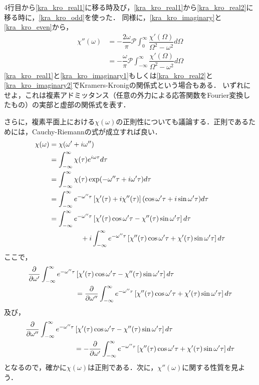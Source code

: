 4行目から\eqref{kra_kro_real1}に移る時及び，\eqref{kra_kro_real1}から\eqref{kra_kro_real2}に移る時に，\eqref{kra_kro_odd}を使った．
同様に，\eqref{kra_kro_imaginary}と\eqref{kra_kro_even}から，
\begin{align}
  \chi''(\omega) &=  - \dfrac{2\omega}{\pi}\mathcal{P}\int^\infty_0\dfrac{\chi'(\Omega)}{\Omega^2 - \omega^2}d\Omega\label{kra_kro_imaginary1} \\
  &=  - \dfrac{\omega}{\pi}\mathcal{P}\int^\infty_{ - \infty}\dfrac{\chi'(\Omega)}{\Omega^2 - \omega^2}d\Omega\label{kra_kro_imaginary2}
\end{align}
\eqref{kra_kro_real1}と\eqref{kra_kro_imaginary1}もしくは\eqref{kra_kro_real2}と\eqref{kra_kro_imaginary2}でKramers-Kronigの関係式という場合もある．
いずれにせよ，これは複素アドミッタンス（任意の外力による応答関数をFourier変換したもの）の実部と虚部の関係式を表す．

さらに，複素平面上における$\chi(\omega)$の正則性についても議論する．正則であるためには，Cauchy-Riemannの式が成立すれば良い．
\begin{align}
  \chi(\omega) &= \chi(\omega'+i\omega'')\notag \\
  &= \int^\infty_{ - \infty} \chi(\tau)e^{i\omega\tau}d\tau\notag \\
  &= \int^\infty_{ - \infty} \chi(\tau)\exp( - \omega''\tau+i\omega'\tau)d\tau\notag \\
  &= \int^\infty_{ - \infty} e^{ - \omega''\tau}\left[\chi'(\tau)+i\chi''(\tau)\right](\cos\omega'\tau+i\sin\omega'\tau)d\tau\notag \\
  &= \int^\infty_{ - \infty} e^{ - \omega''\tau}\left[\chi'(\tau)\cos\omega'\tau - \chi''(\tau)\sin\omega'\tau\right]d\tau\notag \\
  & \hspace{45pt} +i\int^\infty_{ - \infty} e^{ - \omega''\tau}\left[\chi''(\tau)\cos\omega'\tau+\chi'(\tau)\sin\omega'\tau\right]d\tau\label{kra_kro_chi_comp}
\end{align}
ここで，
\begin{align}
  \dfrac{\partial}{\partial{\omega'}}\int^\infty_{ - \infty} e^{ - \omega''\tau}&\left[\chi'(\tau)\cos\omega'\tau - \chi''(\tau)\sin\omega'\tau\right]d\tau\notag \\
  &= \dfrac{\partial}{\partial{\omega''}}\int^\infty_{ - \infty} e^{ - \omega''\tau}\left[\chi''(\tau)\cos\omega'\tau+\chi'(\tau)\sin\omega'\tau\right]d\tau
\end{align}
及び，
\begin{align}
  \dfrac{\partial}{\partial{\omega''}}\int^\infty_{ - \infty} e^{ - \omega''\tau}&\left[\chi'(\tau)\cos\omega'\tau - \chi''(\tau)\sin\omega'\tau\right]d\tau\notag \\
  &=  - \dfrac{\partial}{\partial{\omega'}}\int^\infty_{ - \infty} e^{ - \omega''\tau}\left[\chi''(\tau)\cos\omega'\tau+\chi'(\tau)\sin\omega'\tau\right]d\tau
\end{align}
となるので，確かに$\chi(\omega)$は正則である．次に，$\chi''(\omega)$に関する性質を見よう．

